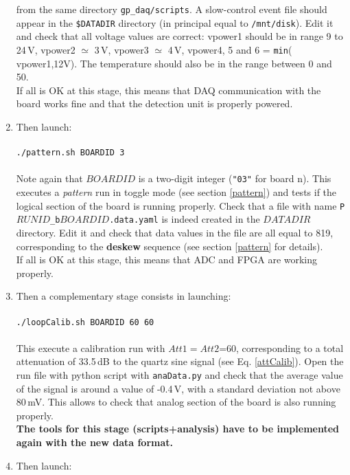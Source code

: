 \begin{enumerate}[1-]
{from the same directory \texttt{gp\_daq/scripts}. A slow-control event file should appear in the \texttt{\$DATADIR} directory (in principal equal to \texttt{/mnt/disk}). Edit it and check that all voltage values are correct: vpower1 should be in range 9 to 24\,V, vpower2 $\simeq$ 3\,V, vpower3 $\simeq$ 4\,V, vpower4, 5 and 6 = \texttt{min}( vpower1,12V). The temperature should also be in the range between 0 and 50\degree.  \\
If all is OK at this stage, this means that DAQ communication with the board works fine and that the detection unit is properly powered. \\}
%
\item{Then launch:\\
\ \\
\texttt{./pattern.sh BOARDID 3} \\
\ \\
Note again that $BOARDID$ is a two-digit integer (\texttt{"03"} for board n). This executes a {\it pattern} run in toggle mode (see section \ref{pattern}) and tests if the logical section of the board is running properly. Check that a file with name \texttt{P$RUNID$\_b$BOARDID$.data.yaml} is indeed created in the $DATADIR$ directory. Edit it and check that data values in the file are all equal to 819, corresponding to the {\bf deskew} sequence (see section \ref{pattern} for details).   \\
If all is OK at this stage, this means that ADC and FPGA are working properly. \\}
%
\item{Then a complementary stage consists in launching: \\
\ \\
\texttt{./loopCalib.sh BOARDID 60 60} \\
\ \\
This execute a calibration run with $Att1=Att2$=60, corresponding to a total attenuation of 33.5\,dB to the quartz sine signal (see Eq. \ref{attCalib}). Open the run file with python script with \texttt{anaData.py} and check that the average value of the signal is around a value of -0.4\,V, with a standard deviation not above 80\,mV. This allows to check that analog section of the board is also running properly. \\
\bf{The tools for this stage (scripts+analysis) have to be implemented again with the new data format.} \\}
%
\item{Then launch: \\
}
\end{enumerate}
